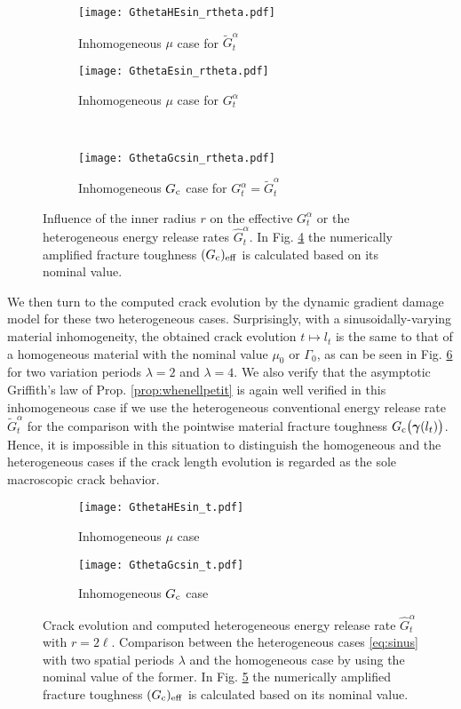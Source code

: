 \begin{figure}[htbp]
\centering
\begin{subfigure}[b]{0.48\textwidth}
\centering
\texttt{[image: GthetaHEsin\_rtheta.pdf]}
\caption{Inhomogeneous $\mu$ case for $\widetilde{G}^\alpha_t$} \label{fig:muHofr2}
\end{subfigure}
\begin{subfigure}[b]{0.48\textwidth}
\centering
\texttt{[image: GthetaEsin\_rtheta.pdf]}
\caption{Inhomogeneous $\mu$ case for $G^\alpha_t$} \label{fig:muHofr}
\end{subfigure} \\ \vspace{0.5cm}
\begin{subfigure}[b]{0.48\textwidth}
\centering
\texttt{[image: GthetaGcsin\_rtheta.pdf]}
\caption{Inhomogeneous $G_\mathrm{c}$ case for $G^\alpha_t=\widetilde{G}^\alpha_t$} \label{fig:gcHofr}
\end{subfigure}
\caption{Influence of the inner radius $r$ on the effective $G^\alpha_t$ or the heterogeneous energy release rates $\widehat{G}^\alpha_t$. In Fig. \ref{fig:gcHofr} the numerically amplified fracture toughness $(G_\mathrm{c})_\mathrm{eff}$ is calculated based on its nominal value.}
\end{figure}

We then turn to the computed crack evolution by the dynamic gradient damage model for these two heterogeneous cases. Surprisingly, with a sinusoidally-varying material inhomogeneity, the obtained crack evolution $t\mapsto l_t$ is the same to that of a homogeneous material with the nominal value $\mu_0$ or $\Gamma_0$, as can be seen in Fig. \ref{fig:ltH} for two variation periods $\lambda=2$ and $\lambda=4$. We also verify that the asymptotic Griffith's law of Prop. \ref{prop:whenellpetit} is again well verified in this inhomogeneous case if we use the heterogeneous conventional energy release rate $\widetilde{G}_t^\alpha$ for the comparison with the pointwise material fracture toughness $\gc\bigl(\vec{\gamma}(l_t)\bigr)$. Hence, it is impossible in this situation to distinguish the homogeneous and the heterogeneous cases if the crack length evolution is regarded as the sole macroscopic crack behavior.
\begin{figure}[htbp]
\centering
\begin{subfigure}[b]{0.48\textwidth}
\centering
\texttt{[image: GthetaHEsin\_t.pdf]}
\caption{Inhomogeneous $\mu$ case}
\end{subfigure}
\begin{subfigure}[b]{0.48\textwidth}
\centering
\texttt{[image: GthetaGcsin\_t.pdf]}
\caption{Inhomogeneous $G_\mathrm{c}$ case} \label{fig:Gc_t}
\end{subfigure}
\caption{Crack evolution and computed heterogeneous energy release rate $\widehat{G}^\alpha_t$ with $r=2\ell$. Comparison between the heterogeneous cases \eqref{eq:sinus} with two spatial periods $\lambda$ and the homogeneous case by using the nominal value of the former. In Fig. \ref{fig:Gc_t} the numerically amplified fracture toughness $(G_\mathrm{c})_\mathrm{eff}$ is calculated based on its nominal value.} \label{fig:ltH}
\end{figure}

